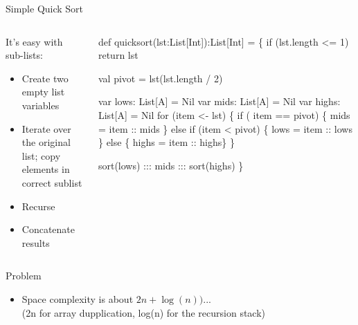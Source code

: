 \begin{frame}[fragile]{Simple Quick Sort}
  \begin{columns}
    \begin{column}{.44\linewidth}
      \begin{block}{It's easy with sub-lists:}
        \begin{itemize}
        \item Create two empty list variables
        \item Iterate over the original list;
          copy elements in correct sublist
        \item Recurse
        \item Concatenate results
        \end{itemize}
      \end{block}
    \end{column}
    \begin{column}{.55\linewidth}
    \begin{boitecode}{}
def quicksort(lst:List[Int]):List[Int] = \{
  if (lst.length <= 1) 
    return lst
  
  val pivot = lst(lst.length / 2)      

  var lows: List[A] = Nil
  var mids: List[A] = Nil
  var highs: List[A] = Nil
  for (item <- lst) \{ 
    if ( item == pivot)    \{ mids  = item :: mids \}
    else if (item < pivot) \{ lows  = item :: lows \}
    else                   \{ highs = item :: highs\}
  \}

  sort(lows) ::: mids ::: sort(highs) 
\}      
    \end{boitecode}      
    \end{column}
  \end{columns}

  \begin{block}{Problem}
    \begin{itemize}
    \item Space complexity is about $2n+\log(n))$...\\
      {\small (2n for array dupplication, log(n) for the recursion stack)}
    \end{itemize}
  \end{block}
\end{frame}
